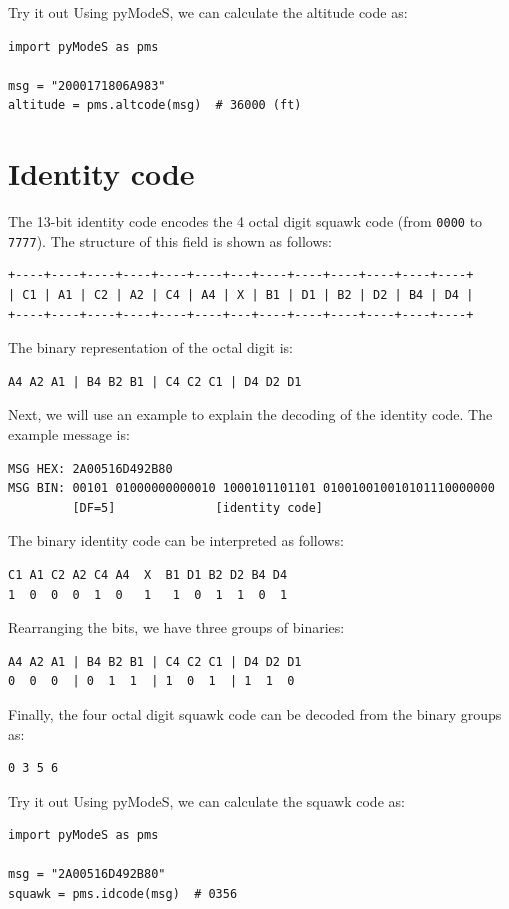 \begin{notebox}{Try it out}
Using pyModeS, we can calculate the altitude code as: 

\begin{verbatim}
import pyModeS as pms

msg = "2000171806A983"
altitude = pms.altcode(msg)  # 36000 (ft)
\end{verbatim}

\end{notebox}


\section{Identity code} \label{sec:id_code}

The 13-bit identity code encodes the 4 octal digit squawk code (from \texttt{0000} to \texttt{7777}). The structure of this field is shown as follows:

\begin{verbatim}
+----+----+----+----+----+----+---+----+----+----+----+----+----+
| C1 | A1 | C2 | A2 | C4 | A4 | X | B1 | D1 | B2 | D2 | B4 | D4 |
+----+----+----+----+----+----+---+----+----+----+----+----+----+
\end{verbatim}

The binary representation of the octal digit is:

\begin{verbatim}
A4 A2 A1 | B4 B2 B1 | C4 C2 C1 | D4 D2 D1
\end{verbatim}


Next, we will use an example to explain the decoding of the identity code. The example message is:

\begin{verbatim}
MSG HEX: 2A00516D492B80
MSG BIN: 00101 01000000000010 1000101101101 010010010010101110000000
         [DF=5]              [identity code]
\end{verbatim}

The binary identity code can be interpreted as follows:

\begin{verbatim}
C1 A1 C2 A2 C4 A4  X  B1 D1 B2 D2 B4 D4
1  0  0  0  1  0   1   1  0  1  1  0  1
\end{verbatim}

Rearranging the bits, we have three groups of binaries:
\begin{verbatim}
A4 A2 A1 | B4 B2 B1 | C4 C2 C1 | D4 D2 D1
0  0  0  | 0  1  1  | 1  0  1  | 1  1  0
\end{verbatim}

Finally, the four octal digit squawk code can be decoded from the binary groups as:
\begin{verbatim}
0 3 5 6
\end{verbatim}

\begin{notebox}{Try it out}
Using pyModeS, we can calculate the squawk code as: 

\begin{verbatim}
import pyModeS as pms

msg = "2A00516D492B80"
squawk = pms.idcode(msg)  # 0356
\end{verbatim}

\end{notebox}
